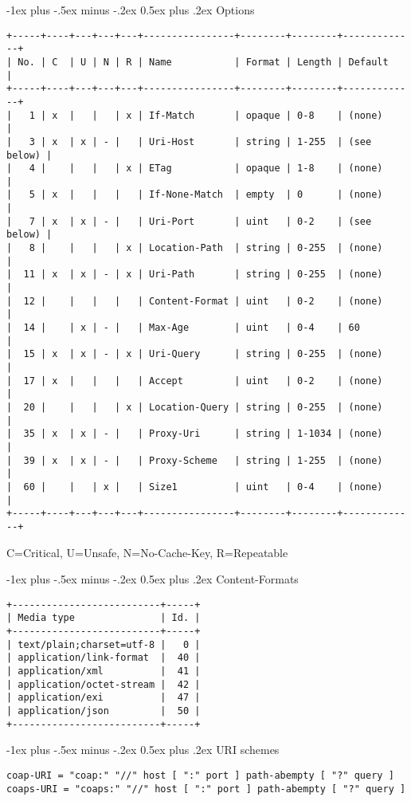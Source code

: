 \documentclass[10pt,landscape]{article}
\makeatletter
\renewcommand{\section}{\@startsection{section}{1}{0mm}%
                                {-1ex plus -.5ex minus -.2ex}%
                                {0.5ex plus .2ex}%
                                {\normalfont\large\bfseries}}
\makeatother
\begin{document}
\begin{multicols}{3}
\section{Options}
{\tiny
\begin{verbatim}
+-----+----+---+---+---+----------------+--------+--------+-------------+
| No. | C  | U | N | R | Name           | Format | Length | Default     |
+-----+----+---+---+---+----------------+--------+--------+-------------+
|   1 | x  |   |   | x | If-Match       | opaque | 0-8    | (none)      |
|   3 | x  | x | - |   | Uri-Host       | string | 1-255  | (see below) |  
|   4 |    |   |   | x | ETag           | opaque | 1-8    | (none)      |
|   5 | x  |   |   |   | If-None-Match  | empty  | 0      | (none)      |
|   7 | x  | x | - |   | Uri-Port       | uint   | 0-2    | (see below) |
|   8 |    |   |   | x | Location-Path  | string | 0-255  | (none)      |
|  11 | x  | x | - | x | Uri-Path       | string | 0-255  | (none)      |
|  12 |    |   |   |   | Content-Format | uint   | 0-2    | (none)      |
|  14 |    | x | - |   | Max-Age        | uint   | 0-4    | 60          |
|  15 | x  | x | - | x | Uri-Query      | string | 0-255  | (none)      |
|  17 | x  |   |   |   | Accept         | uint   | 0-2    | (none)      |
|  20 |    |   |   | x | Location-Query | string | 0-255  | (none)      |
|  35 | x  | x | - |   | Proxy-Uri      | string | 1-1034 | (none)      |
|  39 | x  | x | - |   | Proxy-Scheme   | string | 1-255  | (none)      |
|  60 |    |   | x |   | Size1          | uint   | 0-4    | (none)      |
+-----+----+---+---+---+----------------+--------+--------+-------------+
\end{verbatim}
C=Critical, U=Unsafe, N=No-Cache-Key, R=Repeatable
}

\section{Content-Formats}
{\tiny
\begin{verbatim}
+--------------------------+-----+
| Media type               | Id. |
+--------------------------+-----+
| text/plain;charset=utf-8 |   0 |
| application/link-format  |  40 |
| application/xml          |  41 |
| application/octet-stream |  42 |
| application/exi          |  47 |
| application/json         |  50 |
+--------------------------+-----+
\end{verbatim}
}

\section{URI schemes}
{\tiny
\begin{verbatim}
coap-URI = "coap:" "//" host [ ":" port ] path-abempty [ "?" query ]
coaps-URI = "coaps:" "//" host [ ":" port ] path-abempty [ "?" query ]
\end{verbatim}
}


\end{multicols}
\end{document}
